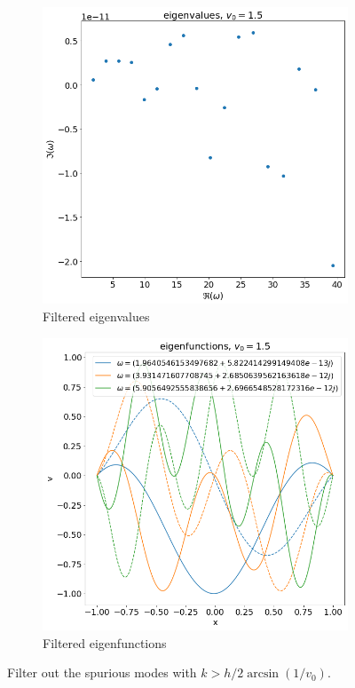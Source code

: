 \begin{figure}[H]
	\centering
	\begin{subfigure}[b]{0.5\linewidth}
		\includegraphics[width=\linewidth]{img/eigvals-G-filtered.png} 
		\caption{Filtered eigenvalues}
		\label{fig:results-G-a}
	\end{subfigure}%
	\begin{subfigure}[b]{0.5\linewidth}
		\includegraphics[width=\linewidth]{img/eigfuncs-G-filtered.png} 
		\caption{Filtered eigenfunctions}
		\label{fig:results-G-b}
	\end{subfigure}
	\caption{Filter out the spurious modes with $k>h/2\arcsin(1/v_0)$.}
	\label{fig:results-G}
\end{figure}


